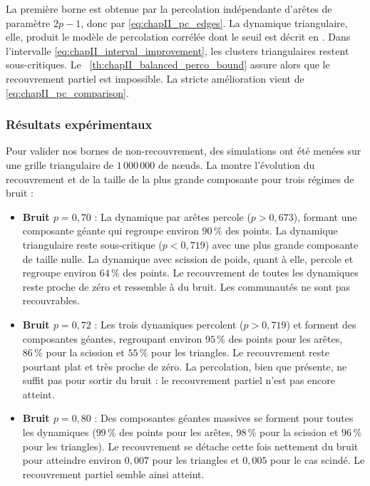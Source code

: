 \begin{Preuve}
La première borne est obtenue par la percolation indépendante d'arêtes de paramètre $2p-1$, donc par \eqref{eq:chapII_pc_edges}. La dynamique triangulaire, elle, produit le modèle de percolation corrélée dont le seuil est décrit en . Dans l'intervalle \eqref{eq:chapII_interval_improvement}, les clusters triangulaires restent sous-critiques. Le \Th~\ref{th:chapII_balanced_perco_bound} assure alors que le recouvrement partiel est impossible. La stricte amélioration vient de \eqref{eq:chapII_pc_comparison}.
\end{Preuve}

\subsubsection{Résultats expérimentaux}

Pour valider nos bornes de non-recouvrement, des simulations ont été menées sur une grille triangulaire de $1\,000\,000$ de nœuds. La  montre l'évolution du recouvrement et de la taille de la plus grande composante pour trois régimes de bruit :

\begin{itemize}
    \item \textbf{Bruit $p = 0,70$} : La dynamique par arêtes percole ($p > 0,673$), formant une composante géante qui regroupe environ $90\,\%$ des points. La dynamique triangulaire reste sous-critique ($p < 0,719$) avec une plus grande composante de taille nulle. La dynamique avec scission de poids, quant à elle, percole et regroupe environ $64\,\%$ des points. Le recouvrement de toutes les dynamiques reste proche de zéro et ressemble à du bruit. Les communautés ne sont pas recouvrables.
    
    \item \textbf{Bruit $p = 0,72$} : Les trois dynamiques percolent ($p > 0,719$) et forment des composantes géantes, regroupant environ $95\,\%$ des points pour les arêtes, $86\,\%$ pour la scission et $55\,\%$ pour les triangles. Le recouvrement reste pourtant plat et très proche de zéro. La percolation, bien que présente, ne suffit pas pour sortir du bruit : le recouvrement partiel n'est pas encore atteint.
    
    \item \textbf{Bruit $p = 0,80$} : Des composantes géantes massives se forment pour toutes les dynamiques ($99\,\%$ des points pour les arêtes, $98\,\%$ pour la scission et $96\,\%$ pour les triangles). Le recouvrement se détache cette fois nettement du bruit pour atteindre environ $0,007$ pour les triangles et $0,005$ pour le cas scindé. Le recouvrement partiel semble ainsi atteint.
\end{itemize}

